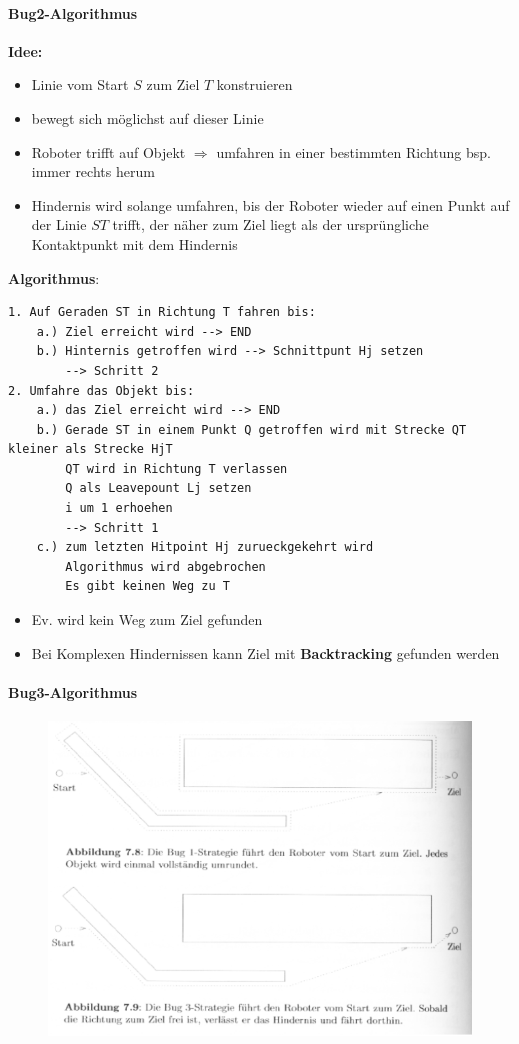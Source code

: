 \paragraph{Bug2-Algorithmus}
\textbf{Idee:}
\begin{itemize}
	\item Linie vom Start $S$ zum Ziel $T$ konstruieren
	\item bewegt sich möglichst auf dieser Linie
	\item Roboter trifft auf Objekt $\Rightarrow$ umfahren in einer bestimmten Richtung bsp. immer rechts herum
	\item Hindernis wird solange umfahren, bis der Roboter wieder auf einen Punkt auf der Linie $ST$ trifft, der näher zum Ziel liegt als der ursprüngliche Kontaktpunkt mit dem Hindernis
\end{itemize}
\textbf{Algorithmus}:
\begin{lstlisting}
1. Auf Geraden ST in Richtung T fahren bis:
	a.) Ziel erreicht wird --> END
	b.) Hinternis getroffen wird --> Schnittpunt Hj setzen
		--> Schritt 2
2. Umfahre das Objekt bis:
	a.) das Ziel erreicht wird --> END
	b.) Gerade ST in einem Punkt Q getroffen wird mit Strecke QT kleiner als Strecke HjT
		QT wird in Richtung T verlassen
		Q als Leavepount Lj setzen
		i um 1 erhoehen
		--> Schritt 1
	c.) zum letzten Hitpoint Hj zurueckgekehrt wird
		Algorithmus wird abgebrochen
		Es gibt keinen Weg zu T
\end{lstlisting}
\begin{itemize}
	\item Ev. wird kein Weg zum Ziel gefunden
\end{itemize}
\begin{itemize}
	\item Bei Komplexen Hindernissen kann Ziel mit \textbf{Backtracking} gefunden werden
\end{itemize}
\paragraph{Bug3-Algorithmus}
\begin{figure}[H]
	\begin{center}
		\includegraphics[scale=0.6]{Resources/PNG/Bug3.PNG}
		\caption{}
		\label{fig:PNG/Bug3.PNG}
	\end{center}
\end{figure}

